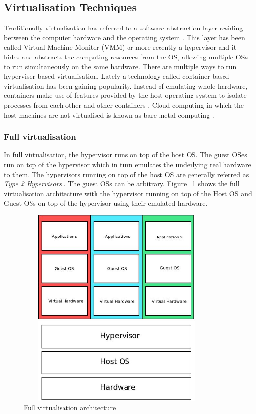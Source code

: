 \subsection{Virtualisation Techniques}

Traditionally virtualisation has referred to a software abstraction layer residing between the computer hardware and the operating system \cite{taxonomy}. This layer has been called Virtual Machine Monitor (VMM) or more recently a hypervisor and it hides and abstracts the computing resources from the OS, allowing multiple OSs to run simultaneously on the same hardware. There are multiple ways to run hypervisor-based virtualisation. Lately a technology called container-based virtualisation has been gaining popularity. Instead of emulating whole hardware, containers make use of features provided by the host operating system to isolate processes from each other and other containers \cite{eder2016hypervisor}. Cloud computing in which the host machines are not virtualised is known as bare-metal computing \cite{virtualisation_overhead}.

\subsubsection{Full virtualisation}

In full virtualisation, the hypervisor runs on top of the host OS. The guest OSes run on top of the hypervisor which in turn emulates the underlying real hardware to them. The hypervisors running on top of the host OS are generally referred as \textit{Type 2 Hypervisors} \cite{eder2016hypervisor}. The guest OSs can be arbitrary. Figure ~\ref{fig:full} shows the full virtualisation architecture with the hypervisor running on top of the Host OS and Guest OSs on top of the hypervisor using their emulated hardware. 

\begin{figure}[ht!]
\centering
  \includegraphics[width=10cm,height=10cm, keepaspectratio]{fullvirt.jpeg}%
  \caption{Full virtualisation architecture}
  \label{fig:full}
\end{figure}

